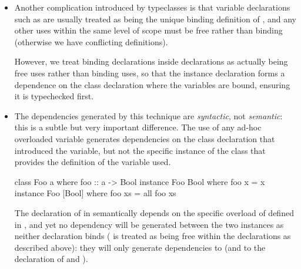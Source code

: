 \documentclass[dissertation.tex]{subfiles}
\begin{document}
{{{\begin{itemize}
{            }
            \item
            {

                Another complication introduced by typeclasses is that variable declarations such as  are usually treated as being the unique binding definition of , and any other uses
                within the same level of scope must be free rather than binding (otherwise we have conflicting
                definitions).
                
                However, we treat binding declarations inside  declarations as actually being free
                uses rather than binding uses, so that the instance declaration forms a dependence on the class
                declaration where the variables are bound, ensuring it is typechecked first.

            }
            \item\label{sec:dependencies-syntactic-semantic}
            {

                The dependencies generated by this technique are \textit{syntactic}, not \textit{semantic}: this is a
                subtle but very important difference. The use of any ad-hoc overloaded variable generates dependencies
                on the class declaration that introduced the variable, but not the specific instance of the class that
                provides the definition of the variable used.

                \begin{haskellfigure}
                class Foo a where
                    foo :: a -> Bool
                instance Foo Bool where
                    foo x = x
                instance Foo [Bool] where
                    foo xs = all foo xs
                \end{haskellfigure}

                The declaration of  in  semantically depends on the specific
                overload of  defined in , and yet no dependency will be
                generated between the two instances as neither declaration binds  ( is treated
                as being free within the declarations as described above): they will only generate dependencies to
                 (and to the declaration of  and ).

}
\end{itemize}}}}
\end{document}
